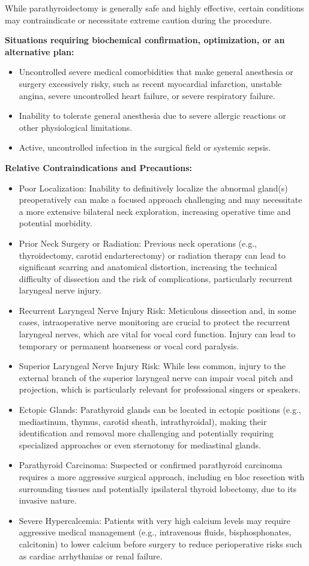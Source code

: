 While parathyroidectomy is generally safe and highly effective, certain conditions may contraindicate or necessitate extreme caution during the procedure.

\textbf{Situations requiring biochemical confirmation, optimization, or an alternative plan:}
\begin{itemize}
  \item Uncontrolled severe medical comorbidities that make general anesthesia or surgery excessively risky, such as recent myocardial infarction, unstable angina, severe uncontrolled heart failure, or severe respiratory failure.
  \item Inability to tolerate general anesthesia due to severe allergic reactions or other physiological limitations.
  \item Active, uncontrolled infection in the surgical field or systemic sepsis.
\end{itemize}

\textbf{Relative Contraindications and Precautions:}
\begin{itemize}
  \item Poor Localization: Inability to definitively localize the abnormal gland(s) preoperatively can make a focused approach challenging and may necessitate a more extensive bilateral neck exploration, increasing operative time and potential morbidity.
  \item Prior Neck Surgery or Radiation: Previous neck operations (e.g., thyroidectomy, carotid endarterectomy) or radiation therapy can lead to significant scarring and anatomical distortion, increasing the technical difficulty of dissection and the risk of complications, particularly recurrent laryngeal nerve injury.
  \item Recurrent Laryngeal Nerve Injury Risk: Meticulous dissection and, in some cases, intraoperative nerve monitoring are crucial to protect the recurrent laryngeal nerves, which are vital for vocal cord function. Injury can lead to temporary or permanent hoarseness or vocal cord paralysis.
  \item Superior Laryngeal Nerve Injury Risk: While less common, injury to the external branch of the superior laryngeal nerve can impair vocal pitch and projection, which is particularly relevant for professional singers or speakers.
  \item Ectopic Glands: Parathyroid glands can be located in ectopic positions (e.g., mediastinum, thymus, carotid sheath, intrathyroidal), making their identification and removal more challenging and potentially requiring specialized approaches or even sternotomy for mediastinal glands.
  \item Parathyroid Carcinoma: Suspected or confirmed parathyroid carcinoma requires a more aggressive surgical approach, including en bloc resection with surrounding tissues and potentially ipsilateral thyroid lobectomy, due to its invasive nature.
  \item Severe Hypercalcemia: Patients with very high calcium levels may require aggressive medical management (e.g., intravenous fluids, bisphosphonates, calcitonin) to lower calcium before surgery to reduce perioperative risks such as cardiac arrhythmias or renal failure.
\end{itemize}


